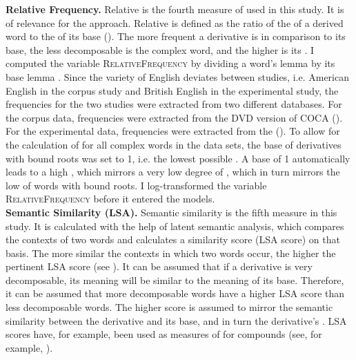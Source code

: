 \textbf{Relative Frequency.} Relative  is the fourth measure of  used in this study. It is of relevance for the  approach. Relative  is defined as the ratio of the  of a derived word to the  of its base (\citealt{Hay.2003}). The more frequent a derivative is in comparison to its base, the less decomposable is the complex word, and the higher is its . 
I computed the variable \textsc{RelativeFrequency} by dividing a word's lemma  by its base lemma . Since the variety of English deviates between studies, i.e. American English in the corpus study and British English in the experimental study, the frequencies for the two studies were extracted from two different databases. For the corpus data, frequencies were extracted from the DVD  version of  {COCA} (\citealt{Davies.20082014}). For the experimental data, frequencies were extracted from the  (\citealt{Davies.2004}).
To allow for the calculation of  for all complex words in the data sets, the base  of derivatives with bound roots was set to 1, i.e. the lowest possible . A base  of 1 automatically leads to a high , which mirrors a very low degree of , which in turn mirrors the low  of words with bound roots. 
I log-transformed the variable \textsc{RelativeFrequency}  before it entered the models.\\

\textbf{Semantic Similarity (LSA).} Semantic similarity is the fifth  measure in this study. It is calculated with the help of latent semantic analysis, which compares the contexts of two words and calculates a similarity score (LSA score) on that basis. The more similar the contexts in which two words occur, the higher the pertinent  LSA score (see \citealt{Landauer.1998}). It can be assumed that if a derivative is very decomposable, its meaning will be similar to the meaning of its base. Therefore, it can be assumed that more decomposable words have a higher LSA score than  less decomposable words. The higher score is assumed to mirror the semantic similarity between the derivative and its base, and in turn the derivative's . LSA scores have, for example, been used as measures of  for compounds (see, for example, \citealt{Wang.2014, Gagne.2016}).

